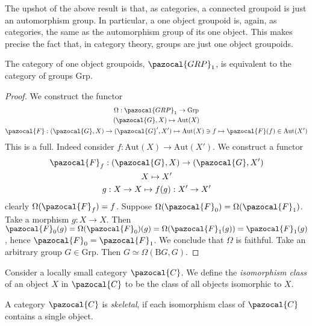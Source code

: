     The upshot of the above result is that, as categories, a connected groupoid is just an automorphism group. In particular, a one object groupoid is, again, as categories, the same as the automorphism group of its one object. This makes precise the fact that, in category theory, groups are just one object groupoids. 
    \begin{corollary}
        The category of one object groupoids, $\pazocal{GRP}_1$, is equivalent to the category of groups $\mathrm{Grp}$. 
    \end{corollary}   
    \begin{proof}
        We construct the functor
        \begin{gather*}
            \Omega: \pazocal{GRP}_{1} \rightarrow \mathrm{Grp}\\
            (\pazocal{G},X)\mapsto \mathrm{Aut}(X)\\
            \pazocal{F} : (\pazocal{G},X)\rightarrow (\pazocal{G}',X') \mapsto \mathrm{Aut}(X)\ni f\mapsto \pazocal{F}(f) \in \mathrm{Aut}(X')
        \end{gather*}
        This is a full. Indeed consider $f : \mathrm{Aut}(X)\rightarrow \mathrm{Aut}(X')$. We construct a functor
        \begin{gather*}
            \pazocal{F}_f : (\pazocal{G},X)\rightarrow (\pazocal{G},X')\\
            X\mapsto X'\\
            g : X\rightarrow X \mapsto f(g) : X'\rightarrow X'
        \end{gather*}
        clearly $\Omega(\pazocal{F}_f)= f$. Suppose $\Omega(\pazocal{F}_0) = \Omega(\pazocal{F}_1)$. Take a morphism $g:X\rightarrow X$. Then $\pazocal{F}_0(g) = \Omega(\pazocal{F}_0)(g)=\Omega(\pazocal{F}_1(g)) = \pazocal{F}_1(g)$, hence $\pazocal{F}_0=\pazocal{F}_1$. We conclude that $\Omega$ is faithful. Take an arbitrary group $G\in \mathrm{Grp}$. Then $G\simeq \Omega(\mathrm{B}G,G)$. 
    \end{proof}
    \begin{definition}
        Consider a locally small category $\pazocal{C}$. We define the \emph{isomorphism class} of an object $X$ in $\pazocal{C}$ to be the class of all objects isomorphic to $X$.
    \end{definition}
    \begin{definition}
        A category $\pazocal{C}$ is \emph{skeletal}, if each isomorphism class of $\pazocal{C}$ contains a single object. 
    \end{definition}
